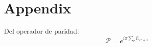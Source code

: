 \section{Appendix} \label{sec:appendix}
Del operador de paridad: 
\begin{equation} 
\mathcal{P} = e^{i\pi \sum_{r} \hat{n}_{2r+1}}    
\end{equation}
